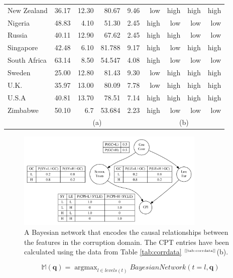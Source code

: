 \documentclass[xcolor={table}]{beamer}
\newcommand{\ourRef}[1]{\ref{#1} $^{\text{\tiny[\pageref{#1}]}}$}
\DeclareMathOperator*{\argmax}{argmax}
\begin{document}
\begin{frame}
\begin{table}[htb]
\begin{tiny}
\begin{tabular}{l|rrrr|rrrr}
New Zealand & 36.17 & 12.30 & 80.67 & 9.46 & low & high & high & high\\
Nigeria & 48.83 & 4.10 & 51.30 & 2.45 & high & low & low & low\\
Russia & 40.11 & 12.90 & 67.62 & 2.45 & high & high & low & low\\
Singapore & 42.48 & 6.10 & 81.788 & 9.17 & high & low & high & high\\
South Africa & 63.14 & 8.50 & 54.547 & 4.08 & high & low & low & low\\
Sweden & 25.00 & 12.80 & 81.43 & 9.30 & low & high & high & high\\
U.K. & 35.97 & 13.00 & 80.09 & 7.78 & low & high & high & high\\
U.S.A & 40.81 & 13.70 & 78.51 & 7.14 & high & high & high & high\\
Zimbabwe & 50.10 & 6.7 & 53.684 & 2.23 & high & low & low & low\\
\hline
\multicolumn{1}{c}{~} & \multicolumn{4}{c}{(a)} & \multicolumn{4}{c}{(b)}
\end{tabular}
\end{tiny}
\end{table}
\end{frame} 



 \begin{frame} 
\begin{figure}
\begin{center}
\includegraphics[width=0.8\textwidth]{./images/corruptionbn2.pdf}
\end{center}
\caption{A Bayesian network that encodes the causal relationships between the features in the corruption domain. The CPT entries have been calculated using the data from Table \ourRef{tab:corrdata}(b).}
\label{fig:corrbn}
\end{figure}
\end{frame} 



 \begin{frame} 
\begin{equation}
\mathbb{M}(\mathbf{q}) = \argmax_{l \in levels(t)} BayesianNetwork(t=l,\mathbf{q})
\end{equation}
\end{frame} 
\end{document}
